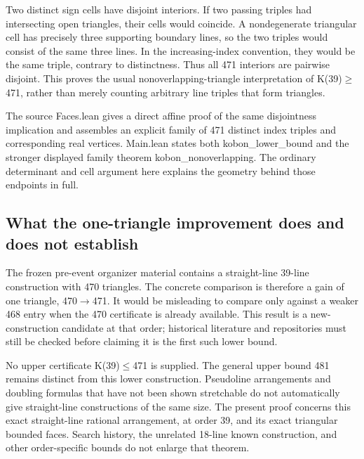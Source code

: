\documentclass[11pt,a4paper]{article}
\begin{document}
Two distinct sign cells have disjoint interiors. If two passing triples had intersecting open triangles, their cells would coincide. A nondegenerate triangular cell has precisely three supporting boundary lines, so the two triples would consist of the same three lines. In the increasing-index convention, they would be the same triple, contrary to distinctness. Thus all 471 interiors are pairwise disjoint. This proves the usual nonoverlapping-triangle interpretation of K(39)\ensuremath{\geq}471, rather than merely counting arbitrary line triples that form triangles.

The source Faces.lean gives a direct affine proof of the same disjointness implication and assembles an explicit family of 471 distinct index triples and corresponding real vertices. Main.lean states both kobon\_lower\_bound and the stronger displayed family theorem kobon\_nonoverlapping. The ordinary determinant and cell argument here explains the geometry behind those endpoints in full.

\subsection{What the one-triangle improvement does and does not establish}
The frozen pre-event organizer material contains a straight-line 39-line construction with 470 triangles. The concrete comparison is therefore a gain of one triangle, 470\ensuremath{\to}471. It would be misleading to compare only against a weaker 468 entry when the 470 certificate is already available. This result is a new-construction candidate at that order; historical literature and repositories must still be checked before claiming it is the first such lower bound.

No upper certificate K(39)\ensuremath{\leq}471 is supplied. The general upper bound 481 remains distinct from this lower construction. Pseudoline arrangements and doubling formulas that have not been shown stretchable do not automatically give straight-line constructions of the same size. The present proof concerns this exact straight-line rational arrangement, at order 39, and its exact triangular bounded faces. Search history, the unrelated 18-line known construction, and other order-specific bounds do not enlarge that theorem.
\end{document}
